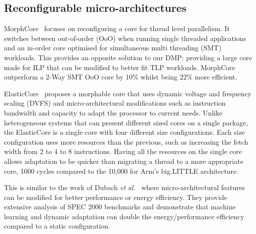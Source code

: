 \vspace{-1em}
\subsection{Reconfigurable micro-architectures}

MorphCore~\cite{khubaibMorphCore2012} focuses on reconfiguring a core for thread level parallelism.
It switches between out-of-order (OoO) when running single threaded applications and an in-order core optimised for simultaneous multi threading (SMT) workloads.
This provides an opposite solution to our DMP: providing a large core made for ILP that can be modified to better fit TLP workloads.
MorphCore outperform a 2-Way SMT OoO core by 10\% whilst being 22\% more efficient.

ElasticCore~\cite{tavanaElastic} proposes a morphable core that uses dynamic voltage and frequency scaling (DVFS) and micro-architectural modifications such as instruction bandwidth and capacity to adapt the processor to current needs.
Unlike heterogeneous systems that can present different sized cores on a single package, the ElasticCore is a single core with four different size configurations.
Each size configuration uses more resources than the previous, such as increasing the fetch width from 2 to 4 to 8 instructions.
Having all the resources on the single core allows adaptation to be quicker than migrating a thread to a  more appropriate core, 1000 cycles compared to the 10,000 for Arm's big.LITTLE architecture.

This is similar to the work of Dubach {\it et al.~}\cite{dubach13dynamic} where micro-architectural features can be modified for better performance or energy efficiency.
They provide extensive analysis of SPEC 2000 benchmarks and demonstrate that machine learning and dynamic adaptation can double the energy/performance efficiency compared to a static configuration.

